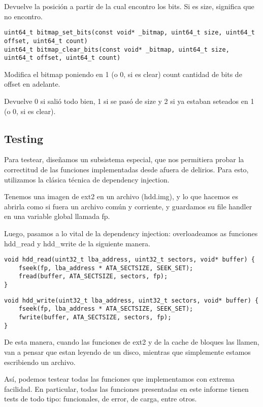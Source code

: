 Devuelve la posición a partir de la cual encontro los bits. Si es size, significa que no encontro.



\begin{lstlisting}[style=customc]
uint64_t bitmap_set_bits(const void* _bitmap, uint64_t size, uint64_t offset, uint64_t count)
uint64_t bitmap_clear_bits(const void* _bitmap, uint64_t size, uint64_t offset, uint64_t count)
\end{lstlisting}

Modifica el bitmap poniendo en 1 (o 0, si es clear) count cantidad de bits de offset en adelante.

Devuelve 0 si salió todo bien, 1 si se pasó de size y 2 si ya estaban seteados en 1 (o 0, si es clear).

\subsection{Testing}

Para testear, diseñamos un subsistema especial, que nos permitiera probar la correctitud de las funciones implementadas desde afuera de delirios. Para esto, utilizamos la clásica técnica de dependency injection.

Tenemos una imagen de ext2 en un archivo (hdd.img), y lo que hacemos es abrirla como si fuera un archivo común y corriente, y guardamos su file handler en una variable global llamada fp.

Luego, pasamos a lo vital de la dependency injection: overloadeamos as funciones hdd\_read y hdd\_write de la siguiente manera.


\begin{lstlisting}[style=customcmucho]
void hdd_read(uint32_t lba_address, uint32_t sectors, void* buffer) {
    fseek(fp, lba_address * ATA_SECTSIZE, SEEK_SET);
    fread(buffer, ATA_SECTSIZE, sectors, fp);
}
\end{lstlisting}

\begin{lstlisting}[style=customcmucho]
void hdd_write(uint32_t lba_address, uint32_t sectors, void* buffer) {
    fseek(fp, lba_address * ATA_SECTSIZE, SEEK_SET);
    fwrite(buffer, ATA_SECTSIZE, sectors, fp);
} 
\end{lstlisting}

De esta manera, cuando las funciones de ext2 y de la cache de bloques las llamen, van a pensar que estan leyendo de un disco, mientras que simplemente estamos escribiendo un archivo.

Así, podemos testear todas las funciones que implementamos con extrema facilidad. En particular, todas las funciones presentadas en este informe tienen tests de todo tipo: funcionales, de error, de carga, entre otros.


